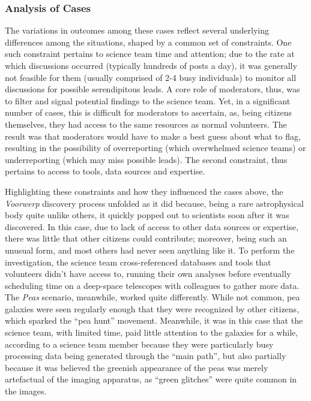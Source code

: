 \documentclass{sigchi}
\begin{document}
\subsubsection{Analysis of Cases}

The variations in outcomes among these cases reflect several underlying differences among the situations, shaped by a common set of constraints.  One such constraint pertains to science team time and attention; due to the rate at which discussions occurred (typically hundreds of posts a day), it was generally not feasible for them (usually comprised of 2-4 busy individuals) to monitor all discussions for possible serendipitous leads.  A core role of moderators, thus, was to filter and signal potential findings to the science team.  Yet, in a significant number of cases, this is difficult for moderators to ascertain, as, being citizens themselves, they had access to the same resources as normal volunteers. The result was that moderators would have to make a best guess about what to flag, resulting in the possibility of overreporting (which overwhelmed science teams) or underreporting (which may miss possible leads).  The second constraint, thus pertains to access to tools, data sources and expertise. 

Highlighting these constraints and how they influenced the cases above, the \emph{Voorwerp} discovery process unfolded as it did because, being a rare astrophysical body quite unlike others, it quickly popped out to scientists soon after it was discovered.  In this case, due to lack of access to other data sources or expertise, there was little that other citizens could contribute; moreover, being such an unusual form, and most others had never seen anything like it. To perform the investigation, the science team cross-referenced databases and tools that volunteers didn't have access to, running their own analyses before eventually scheduling time on a deep-space telescopes with colleagues to gather more data.  The \emph{Peas} scenario, meanwhile, worked quite differently.  While not common, pea galaxies were seen regularly enough that they were recognized by other citizens, which sparked the ``pea hunt'' movement. Meanwhile, it was in this case that the science team, with limited time, paid little attention to the galaxies for a while, according to a science team member because they were particularly busy processing data being generated through the ``main path'', but also partially because it was believed the greenish appearance of the peas was merely artefactual of the imaging apparatus, as ``green glitches'' were quite common in the images. 
\end{document}
